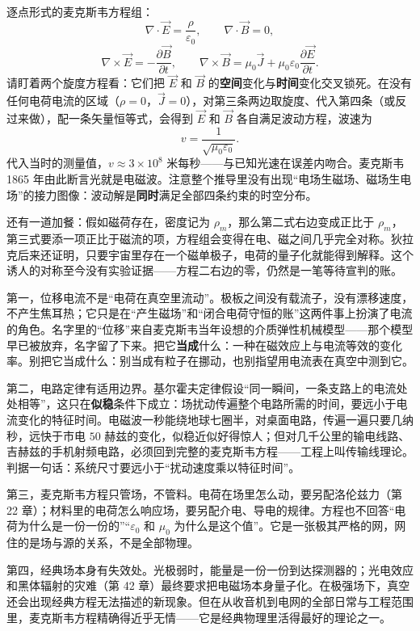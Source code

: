 \begin{challenge}
逐点形式的麦克斯韦方程组：
\[
\nabla\cdot\vec E=\frac{\rho}{\varepsilon_0},\qquad
\nabla\cdot\vec B=0,
\]
\[
\nabla\times\vec E=-\frac{\partial\vec B}{\partial t},\qquad
\nabla\times\vec B=\mu_0\vec J+\mu_0\varepsilon_0\frac{\partial\vec E}{\partial t}.
\]
请盯着两个旋度方程看：它们把 \(\vec E\) 和 \(\vec B\) 的\textbf{空间}变化与\textbf{时间}变化交叉锁死。在没有任何电荷电流的区域（\(\rho=0\)，\(\vec J=0\)），对第三条两边取旋度、代入第四条（或反过来做），配一条矢量恒等式，会得到 \(\vec E\) 和 \(\vec B\) 各自满足波动方程，波速为
\[
v=\frac{1}{\sqrt{\mu_0\varepsilon_0}}.
\]
代入当时的测量值，\(v\approx3\times10^{8}\) 米每秒——与已知光速在误差内吻合。麦克斯韦 1865 年由此断言光就是电磁波。注意整个推导里没有出现“电场生磁场、磁场生电场”的接力图像：波动解是\textbf{同时}满足全部四条约束的时空分布。

还有一道加餐：假如磁荷存在，密度记为 \(\rho_m\)，那么第二式右边变成正比于 \(\rho_m\)，第三式要添一项正比于磁流的项，方程组会变得在电、磁之间几乎完全对称。狄拉克后来还证明，只要宇宙里存在一个磁单极子，电荷的量子化就能得到解释。这个诱人的对称至今没有实验证据——方程二右边的零，仍然是一笔等待宣判的账。
\end{challenge}


第一，位移电流不是“电荷在真空里流动”。极板之间没有载流子，没有漂移速度，不产生焦耳热；它只是在“产生磁场”和“闭合电荷守恒的账”这两件事上扮演了电流的角色。名字里的“位移”来自麦克斯韦当年设想的介质弹性机械模型——那个模型早已被放弃，名字留了下来。把它\textbf{当成}什么：一种在磁效应上与电流等效的变化率。别把它当成什么：别当成有粒子在挪动，也别指望用电流表在真空中测到它。

第二，电路定律有适用边界。基尔霍夫定律假设“同一瞬间，一条支路上的电流处处相等”，这只在\textbf{似稳}条件下成立：场扰动传遍整个电路所需的时间，要远小于电流变化的特征时间。电磁波一秒能绕地球七圈半，对桌面电路，传遍一遍只要几纳秒，远快于市电 \(50\) 赫兹的变化，似稳近似好得惊人；但对几千公里的输电线路、吉赫兹的手机射频电路，必须回到完整的麦克斯韦方程——工程上叫传输线理论。判据一句话：系统尺寸要远小于“扰动速度乘以特征时间”。

第三，麦克斯韦方程只管场，不管料。电荷在场里怎么动，要另配洛伦兹力（第 22 章）；材料里的电荷怎么响应场，要另配介电、导电的规律。方程也不回答“电荷为什么是一份一份的”“\(\varepsilon_0\) 和 \(\mu_0\) 为什么是这个值”。它是一张极其严格的网，网住的是场与源的关系，不是全部物理。

第四，经典场本身有失效处。光极弱时，能量是一份一份到达探测器的；光电效应和黑体辐射的灾难（第 42 章）最终要求把电磁场本身量子化。在极强场下，真空还会出现经典方程无法描述的新现象。但在从收音机到电网的全部日常与工程范围里，麦克斯韦方程精确得近乎无情——它是经典物理里活得最好的理论之一。

